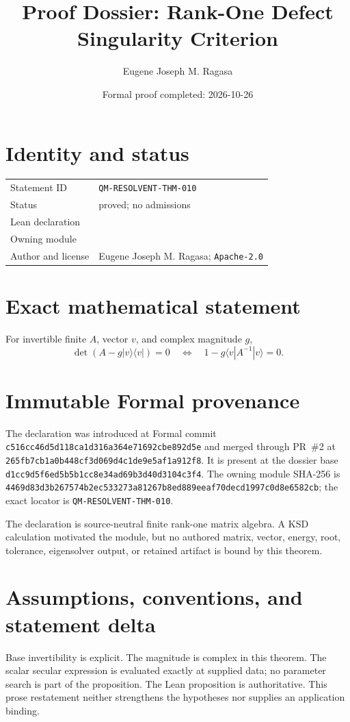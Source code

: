 \documentclass[11pt]{article}
\title{Proof Dossier: Rank-One Defect Singularity Criterion}
\author{Eugene Joseph M. Ragasa}
\date{Formal proof completed: 2026-10-26}
\begin{document}
\raggedright
\maketitle

\section{Identity and status}
\begin{tabularx}{\textwidth}{@{}lY@{}}
\toprule
Statement ID & \texttt{QM-RESOLVENT-THM-010} \\
Status & proved; no admissions \\
Lean declaration &  \\
Owning module &  \\
Author and license & Eugene Joseph M. Ragasa; \texttt{Apache-2.0} \\
\bottomrule
\end{tabularx}

\section{Exact mathematical statement}
For invertible finite $A$, vector $v$, and complex magnitude $g$,
\[
 \det(A-g|v\rangle\langle v|)=0
 \quad\Longleftrightarrow\quad
 1-g\langle v|A^{-1}|v\rangle=0.
\]

\section{Immutable Formal provenance}
The declaration was introduced at Formal commit
\texttt{c516cc46d5d118ca1d316a364e71692cbe892d5e} and merged through PR~\#2 at
\texttt{265fb7cb1a0b448cf3d069d4c1de9e5af1a912f8}.  It is present at the dossier base
\texttt{d1cc9d5f6ed5b5b1cc8e34ad69b3d40d3104c3f4}.  The owning module SHA-256 is
\texttt{4469d83d3b267574b2ec533273a81267b8ed889eeaf70decd1997c0d8e6582cb}; the exact locator is \texttt{QM-RESOLVENT-THM-010}.

The declaration is source-neutral finite rank-one matrix algebra.  A KSD calculation motivated the module, but no authored matrix, vector, energy, root, tolerance, eigensolver output, or retained artifact is bound by this theorem.

\section{Assumptions, conventions, and statement delta}
Base invertibility is explicit.  The magnitude is complex in this theorem.  The scalar secular expression is evaluated exactly at supplied data; no parameter search is part of the proposition.
The Lean proposition is authoritative.  This prose restatement neither strengthens the hypotheses
nor supplies an application binding.
\end{document}
